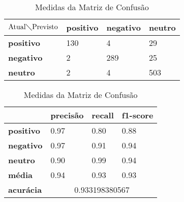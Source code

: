 \begin{table}[h!]
\centering
\begin{minipage}[b]{0.45\linewidth}
\caption{Matriz de Confusão Ternário: \textit{SVM}}
\label{tab:mcb-nb}
\begin{tabular}{|l|l|l|l|}
\hline
$\textrm{Atual}\diagdown\textrm{Previsto}$ & \textbf{positivo} & \textbf{negativo} & \textbf{neutro}\\ \hline
\textbf{positivo} & 130 & 4 & 29\\ \hline
\textbf{negativo} & 2 & 289 & 25\\ \hline
\textbf{neutro} & 2 & 4 & 503\\ \hline
\end{tabular}
\end{minipage}
\hspace{0.5cm}
\begin{minipage}[b]{0.45\linewidth}

\centering
\caption{Medidas da Matriz de Confusão}
\label{tab:mmcb-nb}
\begin{tabular}{|l|l|l|l|}
\hline
         & \textbf{precisão} & \textbf{recall} & \textbf{f1-score} \\ \hline
\textbf{positivo} & 0.97     & 0.80   & 0.88     \\ \hline
\textbf{negativo} & 0.97     & 0.91   & 0.94     \\ \hline
\textbf{neutro} & 0.90     & 0.99   & 0.94     \\ \hline
\textbf{média} & 0.94     & 0.93   & 0.93     \\ \hline
\textbf{acurácia} & \multicolumn{3}{|c|}{0.933198380567}\\ \hline
\end{tabular}
\end{minipage}
\end{table}

